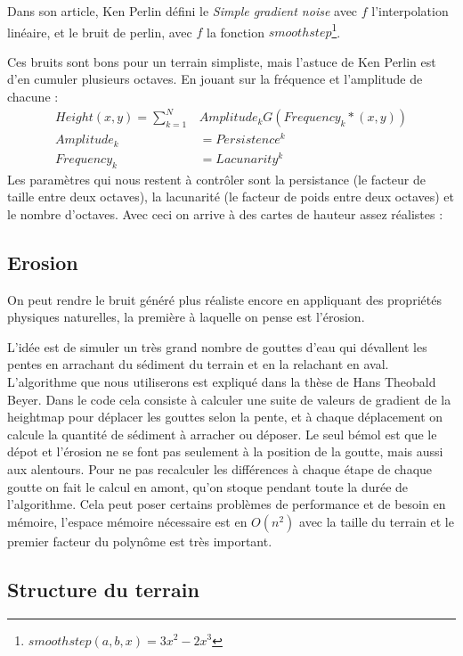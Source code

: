 \documentclass[11pt]{article} %
\begin{document}
Dans son article\cite{perlinnoise}, Ken Perlin défini le \textit{Simple gradient noise} avec $f$ l'interpolation linéaire, et le bruit de perlin, avec $f$ la fonction $smoothstep$\footnote{$smoothstep(a,b,x) = 3x^2-2x^3$}.


Ces bruits sont bons pour un terrain simpliste, mais l'astuce de Ken Perlin est d'en cumuler plusieurs octaves. En jouant sur la fréquence et l'amplitude de chacune :
\begin{align*}
	Height(x,y) = \sum_{k=1}^{N}&Amplitude_k G(Frequency_k*(x,y))\\
	Amplitude_k &= Persistence^k\\ 
	Frequency_k &= Lacunarity^k
\end{align*}
Les paramètres qui nous restent à contrôler sont la persistance (le facteur de taille entre deux octaves), la lacunarité (le facteur de poids entre deux octaves) et le nombre d'octaves. Avec ceci on arrive à des cartes de hauteur assez réalistes :


\subsection{Erosion}

On peut rendre le bruit généré plus réaliste encore en appliquant des propriétés physiques naturelles, la première à laquelle on pense est l'érosion.

L'idée est de simuler un très grand nombre de gouttes d'eau qui dévallent les pentes en arrachant du sédiment du terrain et en la relachant en aval. L'algorithme que nous utiliserons est expliqué dans la thèse de Hans Theobald Beyer\cite{erosion}.
Dans le code cela consiste à calculer une suite de valeurs de gradient de la heightmap pour déplacer les gouttes selon la pente, et à chaque déplacement on calcule la quantité de sédiment à arracher ou déposer. Le seul bémol est que le dépot et l'érosion ne se font pas seulement à la position de la goutte, mais aussi aux alentours. Pour ne pas recalculer les différences à chaque étape de chaque goutte on fait le calcul en amont, qu'on stoque pendant toute la durée de l'algorithme. Cela peut poser certains problèmes de performance et de besoin en mémoire, l'espace mémoire nécessaire est en $O(n^2)$ avec la taille du terrain et le premier facteur du polynôme est très important.

\subsection{Structure du terrain}
\end{document}
